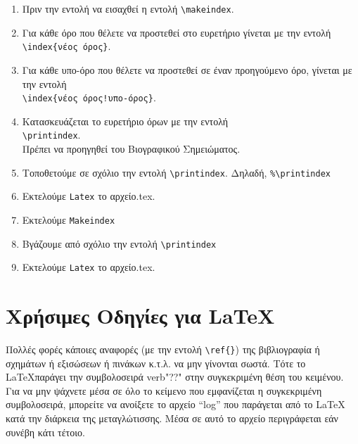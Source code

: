 \begin{enumerate}
  \item Πριν την εντολή \s \verb""\s να εισαχθεί η
  εντολή \s\s \verb"\makeindex".
  \item Για κάθε όρο που θέλετε να προστεθεί στο ευρετήριο γίνεται
  με την εντολή \\ \s\s \verb"\index{νέος όρος}".
  \item Για κάθε υπο-όρο που θέλετε να προστεθεί σε έναν προηγούμενο όρο, γίνεται
  με την εντολή\\ \s\s \verb"\index{νέος όρος!υπο-όρος}".
  \item Κατασκευάζεται το ευρετήριο όρων με την εντολή\\ \s\s
  \verb"\printindex". \\Πρέπει να προηγηθεί του Βιογραφικού
  Σημειώματος.
  \item Τοποθετούμε σε σχόλιο την εντολή \s\s
  \verb"\printindex". Δηλαδή, \s\s
  \verb"%\printindex"
  \item Εκτελούμε \s\s
  \verb"Latex" \s\s το αρχείο.tex.
  \item Εκτελούμε \s\s
  \verb"Makeindex"
  \item Βγάζουμε από σχόλιο την εντολή \s\s
  \verb"\printindex"
  \item Εκτελούμε \s\s
  \verb"Latex" \s\s το αρχείο.tex.
\end{enumerate}






\section{Χρήσιμες Οδηγίες για \LaTeX}
\label{sec:LaTeX}

Πολλές φορές κάποιες αναφορές (με την εντολή \verb"\ref{}") της
βιβλιογραφία ή σχημάτων ή εξισώσεων ή πινάκων κ.τ.λ. να μην
γίνονται σωστά. Τότε το \LaTeX παράγει την συμβολοσειρά verb"??"
στην συγκεκριμένη θέση του κειμένου. Για να μην ψάχνετε μέσα σε
όλο το κείμενο που εμφανίζεται η συγκεκριμένη συμβολοσειρά,
μπορείτε να ανοίξετε το αρχείο ``log'' που παράγεται από το \LaTeX
κατά την διάρκεια της μεταγλώτισσης. Μέσα σε αυτό το αρχείο
περιγράφεται εάν συνέβη κάτι τέτοιο.
